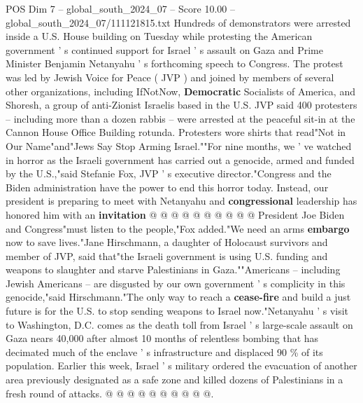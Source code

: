 \begin{textsample}{POS Dim 7 – global\_south\_2024\_07 – Score 10.00 – global\_south\_2024\_07/111121815.txt}  \label{ex:f7_pos_105}
Hundreds of demonstrators were arrested inside a U.S.
House building on Tuesday while protesting the American government ' s continued support for Israel ' s assault on Gaza and Prime Minister Benjamin Netanyahu ' s forthcoming speech to Congress.
The protest was led by Jewish Voice for Peace ( JVP ) and joined by members of several other organizations, including IfNotNow, \textbf{Democratic} Socialists of America, and Shoresh, a group of anti-Zionist Israelis based in the U.S.
JVP said 400 protesters -- including more than a dozen rabbis -- were arrested at the peaceful sit-in at the Cannon House Office Building rotunda.
Protesters wore shirts that read"Not in Our Name"and"Jews Say Stop Arming Israel.""For nine months, we ' ve watched in horror as the Israeli government has carried out a genocide, armed and funded by the U.S.,"said Stefanie Fox, JVP ' s executive director."Congress and the Biden administration have the power to end this horror today.
Instead, our president is preparing to meet with Netanyahu and \textbf{congressional} leadership has honored him with an \textbf{invitation} @ @ @ @ @ @ @ @ @ @ President Joe Biden and Congress"must listen to the people,"Fox added."We need an arms \textbf{embargo} now to save lives."Jane Hirschmann, a daughter of Holocaust survivors and member of JVP, said that"the Israeli government is using U.S. funding and weapons to slaughter and starve Palestinians in Gaza.""Americans -- including Jewish Americans -- are disgusted by our own government ' s complicity in this genocide,"said Hirschmann."The only way to reach a \textbf{cease-fire} and build a just future is for the U.S. to stop sending weapons to Israel now."Netanyahu ' s visit to Washington, D.C. comes as the death toll from Israel ' s large-scale assault on Gaza nears 40,000 after almost 10 months of relentless bombing that has decimated much of the enclave ' s infrastructure and displaced 90 \% of its population.
Earlier this week, Israel ' s military ordered the evacuation of another area previously designated as a safe zone and killed dozens of Palestinians in a fresh round of attacks. @ @ @ @ @ @ @ @ @ @.

\end{textsample}
